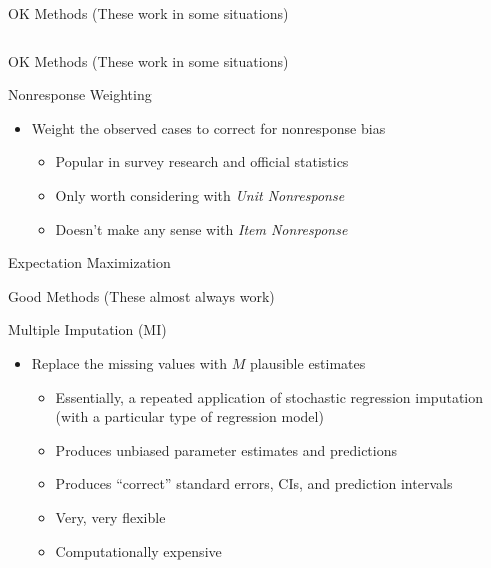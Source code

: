 \documentclass{beamer}\usepackage[]{graphicx}\usepackage[]{color}
\newenvironment{knitrout}{}{} %
\begin{document}
\begin{frame}{OK Methods (These work in some situations)}
\begin{columns}
\begin{column}{0.5\textwidth}
\begin{knitrout}
{}


\end{knitrout}

\end{column}
\end{columns}

\end{frame}

\watermarkon %

\begin{frame}{OK Methods (These work in some situations)}
  
  Nonresponse Weighting
  \vc
  \begin{itemize}
  \item Weight the observed cases to correct for nonresponse bias
    \vc
    \begin{itemize}
    \item Popular in survey research and official statistics
      \vc
    \item Only worth considering with \emph{Unit Nonresponse}
      \vc
    \item Doesn't make any sense with \emph{Item Nonresponse}
    \end{itemize}
  \end{itemize}
  
\end{frame}


\begin{frame}{Expectation Maximization}
  
\end{frame}


\begin{frame}{Good Methods (These almost always work)}
  
  Multiple Imputation (MI)
  \vc
  \begin{itemize}
  \item Replace the missing values with $M$ plausible estimates
    \vc
    \begin{itemize}
    \item Essentially, a repeated application of stochastic regression 
      imputation (with a particular type of regression model)
      \vc
    \item Produces unbiased parameter estimates and predictions
      \vc
    \item Produces ``correct'' standard errors, CIs, and prediction intervals
      \vc
    \item Very, very flexible
      \vc
    \item Computationally expensive
    \end{itemize}
  \end{itemize}
  
\end{frame}
\end{document}
